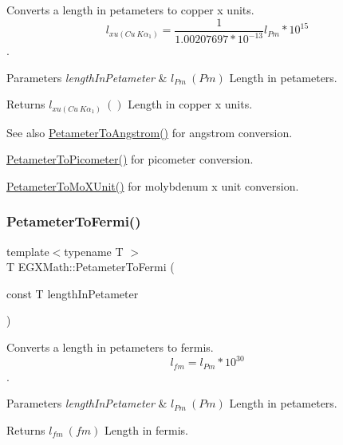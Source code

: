 Converts a length in petameters to copper x units. \[ l_{xu(Cu\ K\alpha_1)}= \frac{1}{1.00207697*10^{-13}} l_{Pm} * 10^{15}\]. 


\begin{DoxyParams}{Parameters}
{\em length\+In\+Petameter} & $ l_{Pm}\ (Pm)$ Length in petameters. \\
\hline
\end{DoxyParams}
\begin{DoxyReturn}{Returns}
$ l_{xu(Cu\ K\alpha_1)}\ ()$ Length in copper x units. 
\end{DoxyReturn}
\begin{DoxySeeAlso}{See also}
\mbox{\hyperlink{group___e_g_x_math-_conversions-_length_conversions-_s_i-_petameter-_non-_s_i_ga2acc301b8b78a80d23a150da8cba3814}{Petameter\+To\+Angstrom()}} for angstrom conversion. 

\mbox{\hyperlink{group___e_g_x_math-_conversions-_length_conversions-_s_i-_petameter-_s_i_ga092df775702bdd1b027e20a243d0aa75}{Petameter\+To\+Picometer()}} for picometer conversion. 

\mbox{\hyperlink{group___e_g_x_math-_conversions-_length_conversions-_s_i-_petameter-_non-_s_i_ga29419ba09bb33a7bc9e23f8cde2efea3}{Petameter\+To\+Mo\+X\+Unit()}} for molybdenum x unit conversion. 
\end{DoxySeeAlso}
\mbox{\label{group___e_g_x_math-_conversions-_length_conversions-_s_i-_petameter-_non-_s_i_gaba0fd76c76316722eb49006d032fa493}} 
\subsubsection{\texorpdfstring{Petameter\+To\+Fermi()}{PetameterToFermi()}}
{\footnotesize\ttfamily template$<$typename T $>$ \\
T E\+G\+X\+Math\+::\+Petameter\+To\+Fermi (\begin{DoxyParamCaption}\item[{const T}]{length\+In\+Petameter }\end{DoxyParamCaption})}



Converts a length in petameters to fermis. \[ l_{fm}=l_{Pm} * 10^{30} \]. 


\begin{DoxyParams}{Parameters}
{\em length\+In\+Petameter} & $ l_{Pm}\ (Pm)$ Length in petameters. \\
\hline
\end{DoxyParams}
\begin{DoxyReturn}{Returns}
$ l_{fm}\ (fm)$ Length in fermis. 
\end{DoxyReturn}
\mbox{\label{group___e_g_x_math-_conversions-_length_conversions-_s_i-_petameter-_non-_s_i_gad1c1c26c232339c6304962d20cb29252}} 
